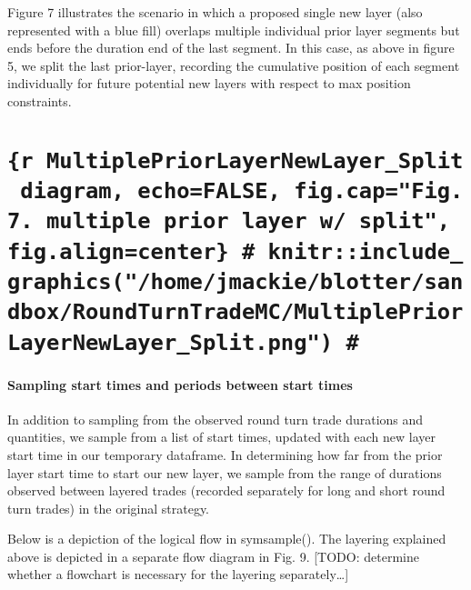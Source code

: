 Figure 7 illustrates the scenario in which a proposed single new layer
(also represented with a blue fill) overlaps multiple individual prior
layer segments but ends before the duration end of the last segment. In
this case, as above in figure 5, we split the last prior-layer,
recording the cumulative position of each segment individually for
future potential new layers with respect to max position constraints.

\hypertarget{r-multiplepriorlayernewlayer_split-diagram-echofalse-fig.capfig.7.-multiple-prior-layer-w-split-fig.aligncenter-knitrinclude_graphicshomejmackieblottersandboxroundturntrademcmultiplepriorlayernewlayer_split.png}{%
\section{\texorpdfstring{\texttt{\{r\ MultiplePriorLayerNewLayer\_Split\ diagram,\ echo=FALSE,\ fig.cap="Fig.7.\ multiple\ prior\ layer\ w/\ split",\ fig.align=\textquotesingle{}center\textquotesingle{}\}\ \#\ knitr::include\_graphics("/home/jmackie/blotter/sandbox/RoundTurnTradeMC/MultiplePriorLayerNewLayer\_Split.png")\ \#}}{\{r MultiplePriorLayerNewLayer\_Split diagram, echo=FALSE, fig.cap="Fig.7. multiple prior layer w/ split", fig.align='center'\} \# knitr::include\_graphics("/home/jmackie/blotter/sandbox/RoundTurnTradeMC/MultiplePriorLayerNewLayer\_Split.png") \#}}\label{r-multiplepriorlayernewlayer_split-diagram-echofalse-fig.capfig.7.-multiple-prior-layer-w-split-fig.aligncenter-knitrinclude_graphicshomejmackieblottersandboxroundturntrademcmultiplepriorlayernewlayer_split.png}}

\hypertarget{sampling-start-times-and-periods-between-start-times}{%
\paragraph{Sampling start times and periods between start
times}\label{sampling-start-times-and-periods-between-start-times}}

In addition to sampling from the observed round turn trade durations and
quantities, we sample from a list of start times, updated with each new
layer start time in our temporary dataframe. In determining how far from
the prior layer start time to start our new layer, we sample from the
range of durations observed between layered trades (recorded separately
for long and short round turn trades) in the original strategy.

Below is a depiction of the logical flow in symsample(). The layering
explained above is depicted in a separate flow diagram in Fig. 9.
{[}TODO: determine whether a flowchart is necessary for the layering
separately\ldots{}{]}

